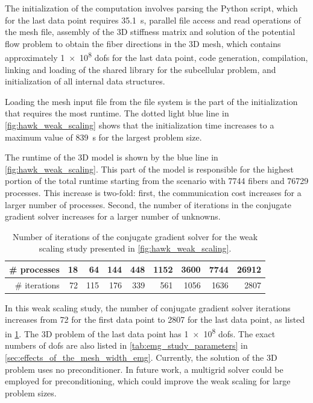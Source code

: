 The initialization of the computation involves parsing the Python script, which for the last data point requires \SI{35.1}{\s}, parallel file access and read operations of the mesh file, assembly of the 3D stiffness matrix and solution of the potential flow problem to obtain the fiber directions in the 3D mesh, which contains approximately \num{1e8} dofs for the last data point, code generation, compilation, linking and loading of the shared library for the subcellular problem, and initialization of all internal data structures.

Loading the mesh input file from the file system is the part of the initialization that requires the most runtime.
The dotted light blue line in \cref{fig:hawk_weak_scaling} shows that the initialization time increases to a maximum value of \SI{839}{\s} for the largest problem size.

The runtime of the 3D model is shown by the blue line in \cref{fig:hawk_weak_scaling}. This part of the model is responsible for the highest portion of the total runtime starting from the scenario with \num{7744} fibers and \num{76729} processes. This increase is two-fold: first, the communication cost increases for a larger number of processes. Second, the number of iterations in the conjugate gradient solver increases for a larger number of unknowns.

\begin{table}
  \centering%
  \begin{tabular}{|r|r|r|r|r|r|r|r|r|}
    \hline
    \# processes  & 18 & 64  & 144 & 448  & 1152 & 3600 & 7744 & \num{26912}\\\hline
    \# iterations & 72 & 115 & 176 & 339  & 561  & 1056 & 1636 & 2807\\
    \hline
  \end{tabular}
  \caption{Number of iterations of the conjugate gradient solver for the weak scaling study presented in \cref{fig:hawk_weak_scaling}.}%
  \label{tab:cg_solver_iterations}%
\end{table}

In this weak scaling study, the number of conjugate gradient solver iterations increases from 72 for the first data point to \num{2807} for the last data point, as listed in \cref{tab:cg_solver_iterations}. The 3D problem of the last data point has \num{1e8} dofs. The exact numbers of dofs are also listed in \cref{tab:emg_study_parameters} in \cref{sec:effects_of_the_mesh_width_emg}.
Currently, the solution of the 3D problem uses no preconditioner. In future work, a multigrid solver could be employed for preconditioning, which could improve the weak scaling for large problem sizes.

